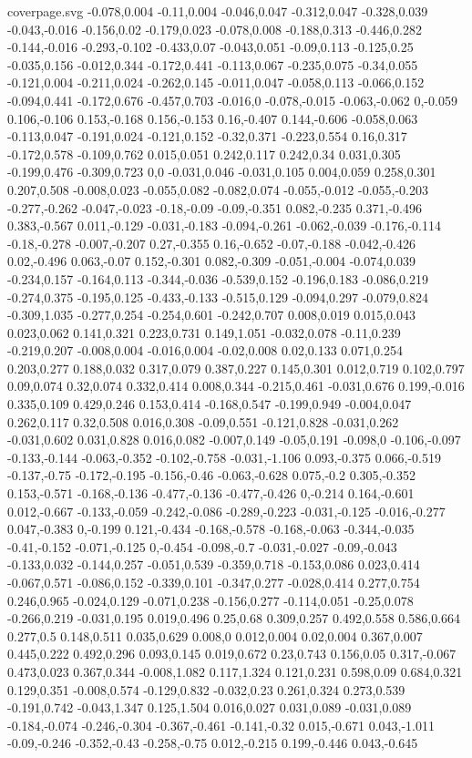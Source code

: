 \begin{filecontents}[noheader]{coverpage.svg}
-0.078,0.004 -0.11,0.004 -0.046,0.047 -0.312,0.047 -0.328,0.039 -0.043,-0.016 -0.156,0.02 -0.179,0.023 -0.078,0.008 -0.188,0.313 -0.446,0.282 -0.144,-0.016 -0.293,-0.102 -0.433,0.07 -0.043,0.051 -0.09,0.113 -0.125,0.25 -0.035,0.156 -0.012,0.344 -0.172,0.441 -0.113,0.067 -0.235,0.075 -0.34,0.055 -0.121,0.004 -0.211,0.024 -0.262,0.145 -0.011,0.047 -0.058,0.113 -0.066,0.152 -0.094,0.441 -0.172,0.676 -0.457,0.703 -0.016,0 -0.078,-0.015 -0.063,-0.062 0,-0.059 0.106,-0.106 0.153,-0.168 0.156,-0.153 0.16,-0.407 0.144,-0.606 -0.058,0.063 -0.113,0.047 -0.191,0.024 -0.121,0.152 -0.32,0.371 -0.223,0.554 0.16,0.317 -0.172,0.578 -0.109,0.762 0.015,0.051 0.242,0.117 0.242,0.34 0.031,0.305 -0.199,0.476 -0.309,0.723 0,0 -0.031,0.046 -0.031,0.105 0.004,0.059 0.258,0.301 0.207,0.508 -0.008,0.023 -0.055,0.082 -0.082,0.074 -0.055,-0.012 -0.055,-0.203 -0.277,-0.262 -0.047,-0.023 -0.18,-0.09 -0.09,-0.351 0.082,-0.235 0.371,-0.496 0.383,-0.567 0.011,-0.129 -0.031,-0.183 -0.094,-0.261 -0.062,-0.039 -0.176,-0.114 -0.18,-0.278 -0.007,-0.207 0.27,-0.355 0.16,-0.652 -0.07,-0.188 -0.042,-0.426 0.02,-0.496 0.063,-0.07 0.152,-0.301 0.082,-0.309 -0.051,-0.004 -0.074,0.039 -0.234,0.157 -0.164,0.113 -0.344,-0.036 -0.539,0.152 -0.196,0.183 -0.086,0.219 -0.274,0.375 -0.195,0.125 -0.433,-0.133 -0.515,0.129 -0.094,0.297 -0.079,0.824 -0.309,1.035 -0.277,0.254 -0.254,0.601 -0.242,0.707 0.008,0.019 0.015,0.043 0.023,0.062 0.141,0.321 0.223,0.731 0.149,1.051 -0.032,0.078 -0.11,0.239 -0.219,0.207 -0.008,0.004 -0.016,0.004 -0.02,0.008 0.02,0.133 0.071,0.254 0.203,0.277 0.188,0.032 0.317,0.079 0.387,0.227 0.145,0.301 0.012,0.719 0.102,0.797 0.09,0.074 0.32,0.074 0.332,0.414 0.008,0.344 -0.215,0.461 -0.031,0.676 0.199,-0.016 0.335,0.109 0.429,0.246 0.153,0.414 -0.168,0.547 -0.199,0.949 -0.004,0.047 0.262,0.117 0.32,0.508 0.016,0.308 -0.09,0.551 -0.121,0.828 -0.031,0.262 -0.031,0.602 0.031,0.828 0.016,0.082 -0.007,0.149 -0.05,0.191 -0.098,0 -0.106,-0.097 -0.133,-0.144 -0.063,-0.352 -0.102,-0.758 -0.031,-1.106 0.093,-0.375 0.066,-0.519 -0.137,-0.75 -0.172,-0.195 -0.156,-0.46 -0.063,-0.628 0.075,-0.2 0.305,-0.352 0.153,-0.571 -0.168,-0.136 -0.477,-0.136 -0.477,-0.426 0,-0.214 0.164,-0.601 0.012,-0.667 -0.133,-0.059 -0.242,-0.086 -0.289,-0.223 -0.031,-0.125 -0.016,-0.277 0.047,-0.383 0,-0.199 0.121,-0.434 -0.168,-0.578 -0.168,-0.063 -0.344,-0.035 -0.41,-0.152 -0.071,-0.125 0,-0.454 -0.098,-0.7 -0.031,-0.027 -0.09,-0.043 -0.133,0.032 -0.144,0.257 -0.051,0.539 -0.359,0.718 -0.153,0.086 0.023,0.414 -0.067,0.571 -0.086,0.152 -0.339,0.101 -0.347,0.277 -0.028,0.414 0.277,0.754 0.246,0.965 -0.024,0.129 -0.071,0.238 -0.156,0.277 -0.114,0.051 -0.25,0.078 -0.266,0.219 -0.031,0.195 0.019,0.496 0.25,0.68 0.309,0.257 0.492,0.558 0.586,0.664 0.277,0.5 0.148,0.511 0.035,0.629 0.008,0 0.012,0.004 0.02,0.004 0.367,0.007 0.445,0.222 0.492,0.296 0.093,0.145 0.019,0.672 0.23,0.743 0.156,0.05 0.317,-0.067 0.473,0.023 0.367,0.344 -0.008,1.082 0.117,1.324 0.121,0.231 0.598,0.09 0.684,0.321 0.129,0.351 -0.008,0.574 -0.129,0.832 -0.032,0.23 0.261,0.324 0.273,0.539 -0.191,0.742 -0.043,1.347 0.125,1.504 0.016,0.027 0.031,0.089 -0.031,0.089 -0.184,-0.074 -0.246,-0.304 -0.367,-0.461 -0.141,-0.32 0.015,-0.671 0.043,-1.011 -0.09,-0.246 -0.352,-0.43 -0.258,-0.75 0.012,-0.215 0.199,-0.446 0.043,-0.645 
\end{filecontents}
